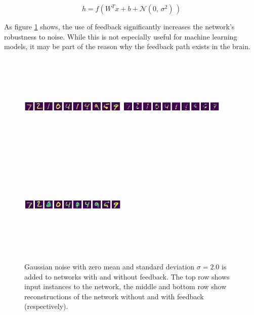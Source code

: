 \documentclass{article}
\begin{document}
		
	\begin{equation}
		h = f(W^T x + b + \mathcal{N}(0,\,\sigma^{2})\,)
	\end{equation}
	
	
	As figure \ref{fig:noiseact} shows, the use of feedback significantly increases the network's robustness to noise. While this is not especially useful for machine learning models, it may be part of the reason why the feedback path exists in the brain. 

	\begin{figure}[H]
      \centering
      \includegraphics[width=0.45\textwidth,height=5cm,keepaspectratio]{img/actnoise_recs/input.png}
      \includegraphics[width=0.45\textwidth,height=5cm,keepaspectratio]{img/actnoise_recs/standardrec.png}
      \includegraphics[width=0.45\textwidth,height=5cm,keepaspectratio]{img/actnoise_recs/feedbackrec.png}
      \caption{Gaussian noise with zero mean and standard deviation $\sigma=2.0$ is added to networks with and without feedback. The top row shows input instances to the network, the middle and bottom row show reconstructions of the network without and with feedback (respectively).}
      \label{fig:noiseact}
  \end{figure}
  
\end{document}
